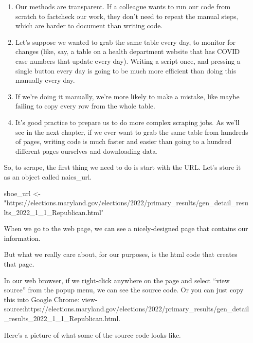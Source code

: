 \documentclass[
  letterpaper,
  DIV=11,
  numbers=noendperiod]{scrreprt}
\newenvironment{Shaded}{\begin{snugshade}}{\end{snugshade}}
\newcommand{\NormalTok}[1]{\textcolor[rgb]{0.00,0.23,0.31}{#1}}
\newcommand{\OtherTok}[1]{\textcolor[rgb]{0.00,0.23,0.31}{#1}}
\newcommand{\StringTok}[1]{\textcolor[rgb]{0.13,0.47,0.30}{#1}}
\providecommand{\tightlist}{%
  \setlength{\itemsep}{0pt}\setlength{\parskip}{0pt}}\usepackage{longtable,booktabs,array}
\begin{document}
\begin{enumerate}
\def\labelenumi{\arabic{enumi}.}
\tightlist
\item
  Our methods are transparent. If a colleague wants to run our code from
  scratch to factcheck our work, they don't need to repeat the manual
  steps, which are harder to document than writing code.
\item
  Let's suppose we wanted to grab the same table every day, to monitor
  for changes (like, say, a table on a health department website that
  has COVID case numbers that update every day). Writing a script once,
  and pressing a single button every day is going to be much more
  efficient than doing this manually every day.
\item
  If we're doing it manually, we're more likely to make a mistake, like
  maybe failing to copy every row from the whole table.
\item
  It's good practice to prepare us to do more complex scraping jobs. As
  we'll see in the next chapter, if we ever want to grab the same table
  from hundreds of pages, writing code is much faster and easier than
  going to a hundred different pages ourselves and downloading data.
\end{enumerate}

So, to scrape, the first thing we need to do is start with the URL.
Let's store it as an object called naics\_url.

\begin{Shaded}
\begin{Highlighting}[]
\NormalTok{sboe\_url }\OtherTok{\textless{}{-}} \StringTok{"https://elections.maryland.gov/elections/2022/primary\_results/gen\_detail\_results\_2022\_1\_1\_Republican.html"}
\end{Highlighting}
\end{Shaded}

When we go to the web page, we can see a nicely-designed page that
contains our information.

But what we really care about, for our purposes, is the html code that
creates that page.

In our web browser, if we right-click anywhere on the page and select
``view source'' from the popup menu, we can see the source code. Or you
can just copy this into Google Chrome:
view-source:https://elections.maryland.gov/elections/2022/primary\_results/gen\_detail\_results\_2022\_1\_1\_Republican.html.

Here's a picture of what some of the source code looks like.
\end{document}
